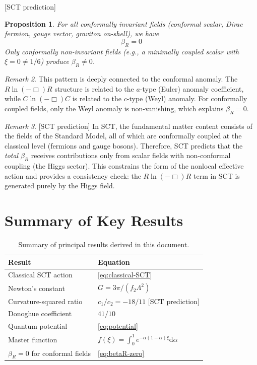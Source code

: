 \documentclass[12pt,a4paper]{article}
\newtheorem{proposition}{Proposition}[section]
\theoremstyle{definition}
\theoremstyle{remark}
\newtheorem{remark}[proposition]{Remark}
\newcommand{\dd}{\mathrm{d}}
\newcommand{\sctpred}{\textcolor{purple!80!black}{\textsf{[SCT prediction]}}}
\begin{document}
\sctpred\;
\begin{proposition}
For all conformally invariant fields (conformal scalar, Dirac fermion,
gauge vector, graviton on-shell), we have
\begin{equation}
  \boxed{\beta_R = 0}
  \label{eq:betaR-zero}
\end{equation}
Only conformally \emph{non-invariant} fields (e.g., a minimally
coupled scalar with $\xi=0 \ne 1/6$) produce $\beta_R \ne 0$.
\end{proposition}

\begin{remark}
This pattern is deeply connected to the conformal anomaly.  The
$R\ln(-\Box)R$ structure is related to the $a$-type (Euler) anomaly
coefficient, while $C\ln(-\Box)C$ is related to the $c$-type (Weyl)
anomaly.  For conformally coupled fields, only the Weyl anomaly is
non-vanishing, which explains $\beta_R=0$.
\end{remark}

\begin{remark}
\sctpred\;
In SCT, the fundamental matter content consists of the fields of the
Standard Model, all of which are conformally coupled at the classical
level (fermions and gauge bosons).  Therefore, SCT predicts that the
\emph{total} $\beta_R$ receives contributions only from scalar fields
with non-conformal coupling (the Higgs sector).  This constrains the
form of the nonlocal effective action and provides a consistency check:
the $R\ln(-\Box)R$ term in SCT is generated purely by the Higgs field.
\end{remark}


\newpage
\section*{Summary of Key Results}

\begin{table}[h]
\centering
\renewcommand{\arraystretch}{1.6}
\begin{tabular}{@{}p{6cm}l@{}}
\toprule
\textbf{Result} & \textbf{Equation} \\
\midrule
Classical SCT action
  & \eqref{eq:classical-SCT} \\[2pt]
Newton's constant
  & $G = 3\pi/(f_2\Lambda^2)$ \\[2pt]
Curvature-squared ratio
  & $c_1/c_2 = -18/11$ \sctpred \\[2pt]
Donoghue coefficient
  & $41/10$ \\[2pt]
Quantum potential
  & \eqref{eq:potential} \\[2pt]
Master function
  & $f(\xi)=\int_0^1 e^{-\alpha(1-\alpha)\xi}\dd\alpha$ \\[2pt]
$\beta_R=0$ for conformal fields
  & \eqref{eq:betaR-zero} \\
\bottomrule
\end{tabular}
\caption{Summary of principal results derived in this document.}
\label{tab:summary}
\end{table}
\end{document}

